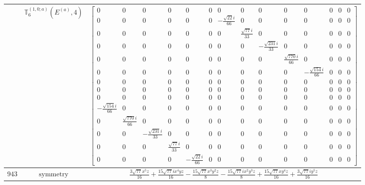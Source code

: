 \documentclass[fleqn,8pt,landscape]{jsarticle}
\begin{document}
\begin{longtable}{ccc}
$  $ & $ \mathbb{T}_{6}^{(1,0;a)}(E^{(a)},4) $ & $ \begin{bmatrix} 0 & 0 & 0 & 0 & 0 & 0 & 0 & 0 & 0 & 0 & 0 & 0 & 0 & 0 \\ 0 & 0 & 0 & 0 & 0 & 0 & - \frac{\sqrt{22} i}{66} & 0 & 0 & 0 & 0 & 0 & 0 & 0 \\ 0 & 0 & 0 & 0 & 0 & 0 & 0 & \frac{\sqrt{77} i}{33} & 0 & 0 & 0 & 0 & 0 & 0 \\ 0 & 0 & 0 & 0 & 0 & 0 & 0 & 0 & - \frac{\sqrt{231} i}{33} & 0 & 0 & 0 & 0 & 0 \\ 0 & 0 & 0 & 0 & 0 & 0 & 0 & 0 & 0 & \frac{\sqrt{770} i}{66} & 0 & 0 & 0 & 0 \\ 0 & 0 & 0 & 0 & 0 & 0 & 0 & 0 & 0 & 0 & - \frac{\sqrt{154} i}{66} & 0 & 0 & 0 \\ 0 & 0 & 0 & 0 & 0 & 0 & 0 & 0 & 0 & 0 & 0 & 0 & 0 & 0 \\ 0 & 0 & 0 & 0 & 0 & 0 & 0 & 0 & 0 & 0 & 0 & 0 & 0 & 0 \\ 0 & 0 & 0 & 0 & 0 & 0 & 0 & 0 & 0 & 0 & 0 & 0 & 0 & 0 \\ - \frac{\sqrt{154} i}{66} & 0 & 0 & 0 & 0 & 0 & 0 & 0 & 0 & 0 & 0 & 0 & 0 & 0 \\ 0 & \frac{\sqrt{770} i}{66} & 0 & 0 & 0 & 0 & 0 & 0 & 0 & 0 & 0 & 0 & 0 & 0 \\ 0 & 0 & - \frac{\sqrt{231} i}{33} & 0 & 0 & 0 & 0 & 0 & 0 & 0 & 0 & 0 & 0 & 0 \\ 0 & 0 & 0 & \frac{\sqrt{77} i}{33} & 0 & 0 & 0 & 0 & 0 & 0 & 0 & 0 & 0 & 0 \\ 0 & 0 & 0 & 0 & - \frac{\sqrt{22} i}{66} & 0 & 0 & 0 & 0 & 0 & 0 & 0 & 0 & 0 \end{bmatrix} $ \\ \hline
$ 943 $ & $ \text{symmetry} $ & $ \frac{3 \sqrt{77} x^{5} z}{16} + \frac{15 \sqrt{77} i x^{4} y z}{16} - \frac{15 \sqrt{77} x^{3} y^{2} z}{8} - \frac{15 \sqrt{77} i x^{2} y^{3} z}{8} + \frac{15 \sqrt{77} x y^{4} z}{16} + \frac{3 \sqrt{77} i y^{5} z}{16} $ \\

\end{longtable}
\end{document}
